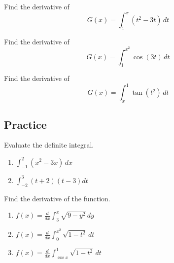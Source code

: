 \begin{example}

Find the derivative of \[G(x)=\int_1^x (t^2-3t)\,dt\]

\end{example}
\vspace*{6\baselineskip}

\begin{example}

Find the derivative of \[G(x)=\int_1^{x^2} \cos(3t)\,dt\]

\end{example}
\vspace*{6\baselineskip}

\begin{example}

Find the derivative of \[G(x)=\int_x^1 \tan(t^2)\,dt\]

\end{example}
\vspace*{6\baselineskip}

\subsection{Practice}

\begin{exercise}

Evaluate the definite integral.

\begin{enumerate}
\item
  \(\displaystyle \int^2_{-1}(x^2-3x)\,dx\)
\item
  \(\displaystyle \int^3_{-2}(t+2)(t-3)dt\)
\end{enumerate}

\end{exercise}

\begin{exercise}

Find the derivative of the function.

\begin{enumerate}
\item
  \(\displaystyle f(x)=\frac{d}{dx}\int^x_3\sqrt{9-y^2}\,dy\)
\item
  \(\displaystyle f(x)=\frac{d}{dx}\int^{x^2}_0\sqrt{1-t^2}\,dt\)
\item
  \(\displaystyle f(x)=\frac{d}{dx}\int^1_{\cos x}\sqrt{1-t^2}\,dt\)
\end{enumerate}

\end{exercise}


